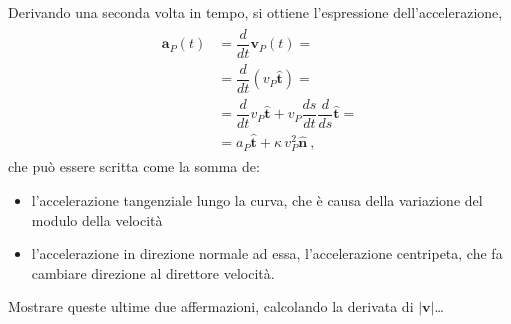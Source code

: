\documentclass[letterpaper,10pt,english]{jupyterBook}
\begin{document}
\sphinxAtStartPar
Derivando una seconda volta in tempo, si ottiene l’espressione dell’accelerazione,
\begin{equation*}
\begin{split}\begin{aligned}
  \mathbf{a}_P(t) & = \dfrac{d}{dt} \mathbf{v}_P(t) = \\
                  & = \dfrac{d}{dt} \left( v_P \hat{\mathbf{t}} \right) = \\
                  & = \dfrac{d}{dt} v_P \hat{\mathbf{t}} + v_P \dfrac{ds}{dt} \dfrac{d}{ds} \hat{\mathbf{t}}= \\
                  & = a_P \hat{\mathbf{t}} + \kappa \, v^2_P \hat{\mathbf{n}}  \ ,
\end{aligned}\end{split}
\end{equation*}
\sphinxAtStartPar
che può essere scritta come la somma de:
\begin{itemize}
\item {} 
\sphinxAtStartPar
l’accelerazione tangenziale lungo la curva, che è causa della variazione del modulo della velocità

\item {} 
\sphinxAtStartPar
l’accelerazione in direzione normale ad essa, l’accelerazione centripeta, che fa cambiare direzione al direttore velocità.

\end{itemize}

\sphinxAtStartPar
{} Mostrare queste ultime due affermazioni, calcolando la derivata di \(|\mathbf{v}|\)…

\sphinxstepscope
\end{document}
